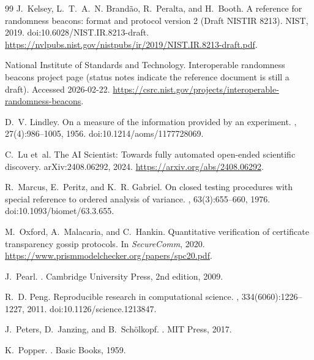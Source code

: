 \documentclass[11pt,a4paper]{article}
\begin{document}
\begin{thebibliography}{99}
J.~Kelsey, L.~T.~A.~N. Brand{\~a}o, R.~Peralta, and H.~Booth.
\newblock A reference for randomness beacons: format and protocol version 2 (Draft {NISTIR} 8213).
\newblock NIST, 2019. doi:10.6028/NIST.IR.8213-draft.
\newblock \url{https://nvlpubs.nist.gov/nistpubs/ir/2019/NIST.IR.8213-draft.pdf}.

National Institute of Standards and Technology.
\newblock Interoperable randomness beacons project page (status notes indicate the reference document is still a draft).
\newblock Accessed 2026-02-22.
\newblock \url{https://csrc.nist.gov/projects/interoperable-randomness-beacons}.

D.~V. Lindley.
\newblock On a measure of the information provided by an experiment.
, 27(4):986--1005, 1956. doi:10.1214/aoms/1177728069.

C.~Lu et~al.
\newblock The AI Scientist: Towards fully automated open-ended scientific discovery.
\newblock arXiv:2408.06292, 2024.
\newblock \url{https://arxiv.org/abs/2408.06292}.

R.~Marcus, E.~Peritz, and K.~R. Gabriel.
\newblock On closed testing procedures with special reference to ordered analysis of variance.
, 63(3):655--660, 1976. doi:10.1093/biomet/63.3.655.

M.~Oxford, A.~Malacaria, and C.~Hankin.
\newblock Quantitative verification of certificate transparency gossip protocols.
\newblock In {\em SecureComm}, 2020.
\newblock \url{https://www.prismmodelchecker.org/papers/spc20.pdf}.

J.~Pearl.
.
\newblock Cambridge University Press, 2nd edition, 2009.

R.~D. Peng.
\newblock Reproducible research in computational science.
, 334(6060):1226--1227, 2011. doi:10.1126/science.1213847.

J.~Peters, D.~Janzing, and B.~Sch{\"o}lkopf.
.
\newblock MIT Press, 2017.

K.~Popper.
.
\newblock Basic Books, 1959.



\end{thebibliography}
\end{document}
